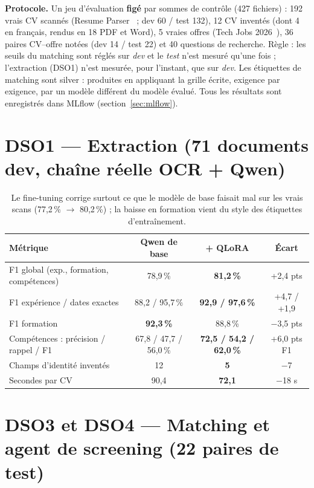 \documentclass[11pt,a4paper]{report}
\begin{document}
\textbf{Protocole.} Un jeu d'évaluation \textbf{figé} par sommes de contrôle (427 fichiers) : 192 vrais CV scannés (Resume Parser~\cite{resumeparser} ; dev 60 / test 132), 12 CV inventés (dont 4 en français, rendus en 18 PDF et Word), 5 vraies offres (Tech Jobs 2026~\cite{techjobs}), 36 paires CV--offre notées (dev 14 / test 22) et 40 questions de recherche. Règle : les seuils du matching sont réglés sur \emph{dev} et le \emph{test} n'est mesuré qu'une fois ; l'extraction (DSO1) n'est mesurée, pour l'instant, que sur \emph{dev}. Les étiquettes de matching sont \og silver\fg{} : produites en appliquant la grille écrite, exigence par exigence, par un modèle différent du modèle évalué. Tous les résultats sont enregistrés dans MLflow (section~\ref{sec:mlflow}).

\section{DSO1 --- Extraction (71 documents dev, chaîne réelle OCR + Qwen)}

\begin{table}[ht]
\centering\small
\begin{tabular}{lccc}
\toprule
\textbf{Métrique} & \textbf{Qwen de base} & \textbf{+ QLoRA} & \textbf{Écart}\\
\midrule
F1 global (exp., formation, compétences) & 78,9\,\% & \textbf{81,2\,\%} & +2,4 pts\\
F1 expérience / dates exactes & 88,2 / 95,7\,\% & \textbf{92,9 / 97,6\,\%} & +4,7 / +1,9\\
F1 formation & \textbf{92,3\,\%} & 88,8\,\% & $-$3,5 pts\\
Compétences : précision / rappel / F1 & 67,8 / 47,7 / 56,0\,\% & \textbf{72,5 / 54,2 / 62,0\,\%} & +6,0 pts F1\\
Champs d'identité inventés & 12 & \textbf{5} & $-$7\\
Secondes par CV & 90,4 & \textbf{72,1} & $-$18 s\\
\bottomrule
\end{tabular}
\caption{Le fine-tuning corrige surtout ce que le modèle de base faisait mal sur les vrais scans (77,2\,\% $\rightarrow$ 80,2\,\%) ; la baisse en formation vient du style des étiquettes d'entraînement.}
\label{tab:dso1}
\end{table}

\section{DSO3 et DSO4 --- Matching et agent de screening (22 paires de test)}
\end{document}
